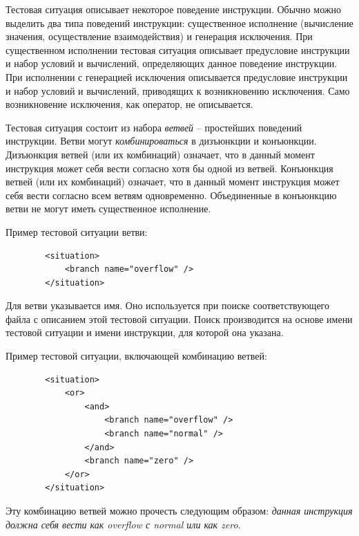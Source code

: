 Тестовая ситуация описывает некоторое поведение инструкции. Обычно
можно выделить два типа поведений инструкции: существенное
исполнение (вычисление значения, осуществление взаимодействия) и
генерация исключения. При существенном исполнении тестовая ситуация
описывает предусловие инструкции и набор условий и вычислений,
определяющих данное поведение инструкции. При исполнении с
генерацией исключения описывается предусловие инструкции и набор
условий и вычислений, приводящих к возникновению исключения. Само
возникновение исключения, как оператор, не описывается.

Тестовая ситуация состоит из набора \emph{ветвей} -- простейших
поведений инструкции. Ветви могут \emph{комбинироваться} в
дизъюнкции и конъюнкции. Дизъюнкция ветвей (или их комбинаций)
означает, что в данный момент инструкция может себя вести согласно
хотя бы одной из ветвей. Конъюнкция ветвей (или их комбинаций)
означает, что в данный момент инструкция может себя вести согласно
всем ветвям одновременно. Объединенные в конъюнкцию ветви не могут
иметь существенное исполнение.

Пример тестовой ситуации ветви: {\small
\begin{verbatim}
        <situation>
            <branch name="overflow" />
        </situation>
\end{verbatim}}

Для ветви указывается имя. Оно используется при поиске
соответствующего файла с описанием этой тестовой ситуации. Поиск
производится на основе имени тестовой ситуации и имени инструкции,
для которой она указана.

Пример тестовой ситуации, включающей комбинацию ветвей: {\small
\begin{verbatim}
        <situation>
            <or>
                <and>
                    <branch name="overflow" />
                    <branch name="normal" />
                </and>
                <branch name="zero" />
            </or>
        </situation>
\end{verbatim}}

Эту комбинацию ветвей можно прочесть следующим образом: \emph{данная
инструкция должна себя вести как overflow с normal или как zero}.

